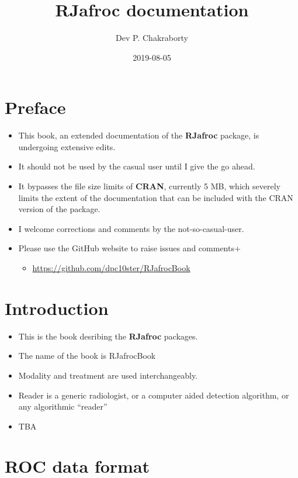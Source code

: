 \documentclass[]{book}
\title{RJafroc documentation}
\author{Dev P. Chakraborty}
\date{2019-08-05}
\providecommand{\tightlist}{%
  \setlength{\itemsep}{0pt}\setlength{\parskip}{0pt}}
\begin{document}
\maketitle

{
\setcounter{tocdepth}{1}
\tableofcontents
}
\hypertarget{preface}{%
\chapter{Preface}\label{preface}}

\begin{itemize}
\tightlist
\item
  This book, an extended documentation of the \textbf{RJafroc} package, is undergoing extensive edits.
\item
  It should not be used by the casual user until I give the go ahead.
\item
  It bypasses the file size limits of \textbf{CRAN}, currently 5 MB, which severely limits the extent of the documentation that can be included with the CRAN version of the package.
\item
  I welcome corrections and comments by the not-so-casual-user.
\item
  Please use the GitHub website to raise issues and comments+

  \begin{itemize}
  \tightlist
  \item
    \url{https://github.com/dpc10ster/RJafrocBook}
  \end{itemize}
\end{itemize}

\hypertarget{intro}{%
\chapter{Introduction}\label{intro}}

\begin{itemize}
\tightlist
\item
  This is the book desribing the \textbf{RJafroc} packages.
\item
  The name of the book is RJafrocBook
\item
  Modality and treatment are used interchangeably.
\item
  Reader is a generic radiologist, or a computer aided detection algorithm, or any algorithmic ``reader''
\item
  TBA
\end{itemize}

\hypertarget{rocdataformat}{%
\chapter{ROC data format}\label{rocdataformat}}
\end{document}
